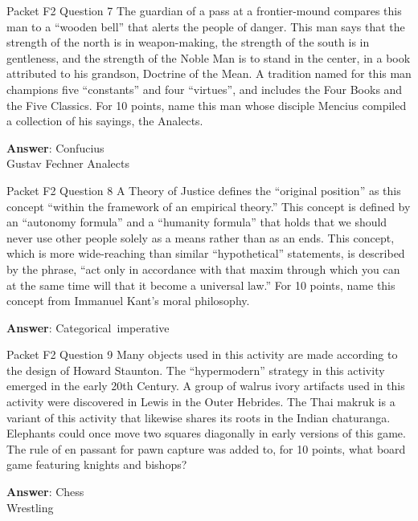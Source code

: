 \begin{frame}{Packet F2 Question 7}
The guardian of a pass at a frontier-mound compares this man to a “wooden bell” that alerts the people of danger. This man says that the strength of the north is in weapon-making, the strength of the south is in gentleness, and the strength of the Noble Man is to stand in the center, in a book attributed to his grandson, Doctrine of the Mean. A tradition named for this man champions five “constants” and four “virtues”, and includes the Four Books and the Five Classics. For 10 points, name this man whose disciple Mencius compiled a collection of his sayings,   the Analects.        

\textbf{Answer}: Confucius\\
 Gustav Fechner
 Analects
\end{frame}

\begin{frame}{Packet F2 Question 8}
A Theory of Justice defines the “original position” as this concept “within the framework of an empirical theory.” This concept is defined by an “autonomy formula” and a “humanity formula” that holds that   we should never use other people solely as a means rather than as an ends. This concept, which is more wide-reaching than similar “hypothetical” statements, is described by the phrase, “act only in accordance with that maxim through which you can at the same time will that it become a universal law.”   For 10 points,   name this concept from Immanuel Kant’s moral   philosophy.

\textbf{Answer}: Categorical\ imperative\\
\end{frame}

\begin{frame}{Packet F2 Question 9}
Many objects used in this activity are made according to the design of Howard Staunton. The “hypermodern” strategy in this activity emerged in the early 20th Century. A group of walrus ivory artifacts used in this activity were discovered in Lewis in the Outer Hebrides. The Thai makruk is a variant of this activity that likewise shares its roots in the Indian chaturanga. Elephants could once move two squares diagonally in early versions of this game. The rule   of en passant for   pawn capture was added to, for 10 points, what board game featuring   knights and bishops?  

\textbf{Answer}: Chess\\
 Wrestling
\end{frame}

